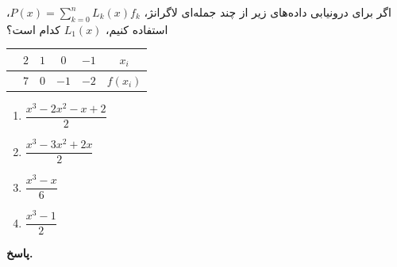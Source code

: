 اگر برای درونیابی داده‌های زیر از چند جمله‌ای لاگرانژ،
\(P(x) = \sum_{k=0}^{n} L_k(x) f_k\)،
استفاده کنیم، 
\(L_1(x)\)
کدام است؟
\begin{center}
	\begin{tabular}{ccccc|c}
		 & \(2\) &\(1\)&\(0\) & \(-1\) & \(x_i\)\\
		\hline
			& \(7\) & \(0\) & \(-1\) &\( -2\) & \(f(x_i)\)
	\end{tabular}
\end{center}

\vspace*{-1.5cm}
 \begin{enumerate}
	\item \(\dfrac{x^3-2x^2-x+2}{2}\)
	\item \(\dfrac{x^3-3x^2+2x}{2}\)
	\item \(\dfrac{x^3-x}{6}\)
	\item \(\dfrac{x^3-1}{2}\)
\end{enumerate}

\begin{answer}

	\textbf{پاسخ.}
	
\end{answer}
